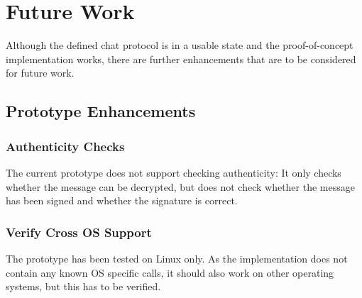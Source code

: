 \section{Future Work}
Although the defined chat protocol is in a usable
state and the proof-of-concept implementation works, there are further
enhancements that are to be considered for future work.
\subsection{Prototype Enhancements}
\subsubsection{Authenticity Checks}
The current prototype does not support checking authenticity: It only checks
whether the message can be decrypted, but does not check whether the message
has been signed and whether the signature is correct.
\subsubsection{Verify Cross OS Support}
The prototype has been tested on Linux only. As the implementation does not
contain any known OS specific calls, it should also work on other operating
systems, but this has to be verified.
